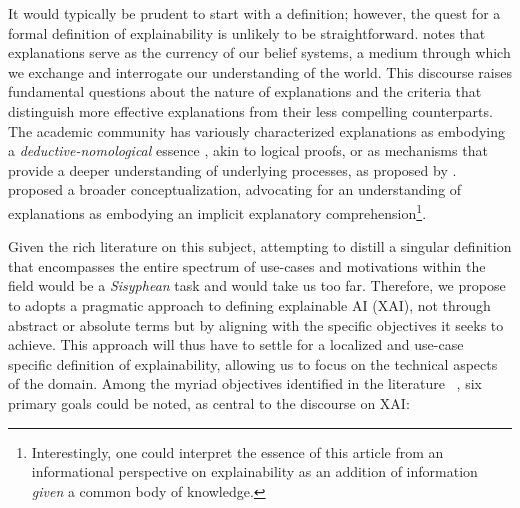 It would typically be prudent to start with a definition; however, the quest for a formal definition of explainability is unlikely to be straightforward. \cite{lombrozo2006structure} notes that explanations serve as the currency of our belief systems, a medium through which we exchange and interrogate our understanding of the world. This discourse raises fundamental questions about the nature of explanations and the criteria that distinguish more effective explanations from their less compelling counterparts. The academic community has variously characterized explanations as embodying a \textit{deductive-nomological} essence \cite{hempel1948studies}, akin to logical proofs, or as mechanisms that provide a deeper understanding of underlying processes, as proposed by \cite{bechtel2005explanation}. \cite{keil2006explanation} proposed a broader conceptualization, advocating for an understanding of explanations as embodying an implicit explanatory comprehension\footnote{Interestingly, one could interpret the essence of this article from an informational perspective on explainability as an addition of information \textit{given} a common body of knowledge.}.

Given the rich literature on this subject, attempting to distill a singular definition that encompasses the entire spectrum of use-cases and motivations within the field would be a \textit{Sisyphean} task and would take us too far. Therefore, we propose to adopts a pragmatic approach to defining explainable AI (XAI), not through abstract or absolute terms but by aligning with the specific objectives it seeks to achieve. This approach will thus have to settle for a localized and use-case specific definition of explainability, allowing us to focus on the technical aspects of the domain. Among the myriad objectives identified in the literature~\cite{jacovi2021formalizing,miller2017explanation,survey2019metrics,saeed2023explainable,weber2023beyond,antoniadi2021current,das2020opportunities}
, six primary goals could be noted, as central to the discourse on XAI:


